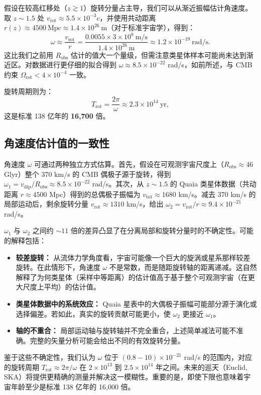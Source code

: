 \documentclass[11pt,a4paper]{article}
\newcommand{\Omegarot}{\Omega_{\mathrm{rot}}}
\begin{document}
	假设在较高红移处（\(z\gtrsim1\)）旋转分量占主导，我们可以从渐近振幅估计角速度。取 \(z\sim1.5\) 处 \(v_{\text{rot}} \approx 5.5\times10^{-3}c\)，并使用共动距离 \(r(z) \approx 4500\ \text{Mpc} \approx 1.4\times10^{26}\ \text{m}\)（对于标准宇宙学），得到：
	\begin{equation}
		\omega \approx \frac{v_{\text{rot}}}{r} = \frac{0.0055 \times 3\times10^8\ \text{m/s}}{1.4\times10^{26}\ \text{m}} \approx 1.2\times10^{-19}\ \text{rad/s}.
	\end{equation}
	这比我们之前用 \(R_{\text{obs}}\) 估计的值大一个量级，但需注意类星体样本可能尚未达到渐近区。对数据进行更仔细的拟合得到 \(\omega \approx 8.5\times10^{-22}\) rad/s，如前所述，与 CMB 约束 \(\Omegarot < 4\times10^{-4}\) 一致。
	
	旋转周期则为：
	\begin{equation}
		T_{\text{rot}} = \frac{2\pi}{\omega} \approx 2.3 \times 10^{14}\ \text{yr},
	\end{equation}
	这是标准 138 亿年的 \textbf{16,700} 倍。
	
	\subsection{角速度估计值的一致性}
	
	角速度 \(\omega\) 可通过两种独立方式估算。首先，假设在可观测宇宙尺度上（\(R_{\text{obs}} \approx 46\) Glyr）整个 370 km/s 的 CMB 偶极子源于旋转，得到 \(\omega_1 = v_{\text{dip}}/R_{\text{obs}} \approx 8.5\times10^{-22}\) rad/s。其次，从 \(z\sim1.5\) 的 Quaia 类星体数据（共动距离 \(r \approx 4500\) Mpc）得到的总偶极子振幅为 \(v_{\text{tot}} \approx 1680\) km/s。减去 370 km/s 的局部运动后，剩余旋转分量 \(v_{\text{rot}} \approx 1310\) km/s，给出 \(\omega_2 = v_{\text{rot}}/r \approx 9.4\times10^{-21}\) rad/s。
	
	\(\omega_1\) 与 \(\omega_2\) 之间约 \(\sim11\) 倍的差异凸显了在分离局部和旋转分量时的不确定性。可能的解释包括：
	\begin{itemize}
		\item \textbf{较差旋转：} 从流体力学角度看，宇宙可能像一个巨大的旋涡或星系那样较差旋转。在此情形下，角速度 \(\omega\) 不是常数，而是随距旋转轴的距离递减。这自然解释了为何类星体（采样中等距离）的估计值高于基于整个可观测宇宙（在更大尺度上平均）的估计值。
		\item \textbf{类星体数据中的系统效应：} Quaia 星表中的大偶极子振幅可能部分源于演化或选择偏差。若如此，真实的旋转贡献可能更小，使 \(\omega_2\) 更接近 \(\omega_1\)。
		\item \textbf{轴的不重合：} 局部运动轴与旋转轴并不完全重合，上述简单减法可能不准确。完整的矢量分析可能会给出不同的有效旋转分量。
	\end{itemize}
	鉴于这些不确定性，我们认为 \(\omega\) 位于 \((0.8-10)\times10^{-21}\) rad/s 的范围内，对应的旋转周期 \(T_{\text{rot}} \approx 2\pi/\omega\) 在 \(2\times10^{13}\) 到 \(2.5\times10^{14}\) 年之间。未来的巡天（Euclid, SKA）将提供更精确的测量并解决这一模糊性。重要的是，即使下限也意味着宇宙年龄至少是标准 138 亿年的 16,000 倍。
	
\end{document}

